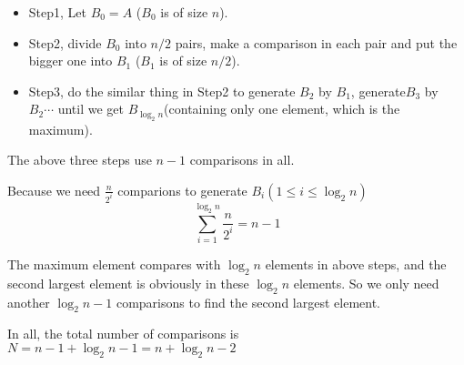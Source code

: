 \begin{itemize}
	\item Step1, Let $B_0 = A$ ($B_0$ is of size $n$).
	\item Step2, divide $B_0$ into $n/2$ pairs, make a comparison in each pair and put the bigger one into $B_1$ ($B_1$ is of size $n/2$).
	\item Step3, do the similar thing in Step2 to generate $B_2$ by $B_1$, generate$B_3$ by $B_2 \cdots$ until we get $B_{\log_{2}n}$(containing only one element, which is the maximum).
\end{itemize}

\indent The above three steps use $n - 1$ comparisons in all.

Because we need $\displaystyle \frac{n}{2^i}$ comparions to generate $B_i (1\leq i \leq \log_{2}n)$
\[\sum_{i = 1} ^ {\log_{2}n} \frac{n}{2^i}= n - 1\]

The maximum element compares with $\log_{2}n$ elements in above steps, and the second largest element is obviously in these $\log_{2}n$ elements. So we only need another $\log_{2}n - 1$ comparisons to find the second largest element.

In all, the total number of comparisons is $N = n - 1 + \log_{2}n - 1 = n + \log_{2}n - 2$
